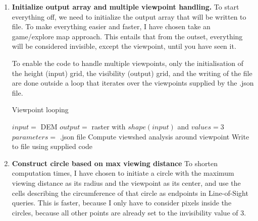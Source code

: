 \documentclass[a4paper]{article}
\begin{document}
\begin{enumerate}
    \item {\bfseries{Initialize output array and multiple viewpoint handling.}}\newline
    To start everything off, we need to initialize the output array that will be written to file. To make everything easier and faster, I have chosen take an game/explore map approach. This entails that from the outset, everything will be considered invisible, except the viewpoint, until you have seen it. 
    
    To enable the code to handle multiple viewpoints, only the initialisation of the height (input) grid, the visibility (output) grid, and the writing of the file are done outside a loop that iterates over the viewpoints supplied by the .json file.\newline
    
\begin{algorithm}
	\caption{Viewpoint looping} 
	\begin{algorithmic}[1]
	\State $input = $ DEM
	\State $output = $ raster with $shape(input)$ and $values = 3$ 
	\State $parameters = $ .json file
		    \State Compute viewshed analysis around viewpoint
		\EndFor
		\State Write to file using supplied code
	\end{algorithmic} 
\end{algorithm}
    \item{\bfseries{Construct circle based on max viewing distance}}\newline
    To shorten computation times, I have chosen to initiate a circle with the maximum viewing distance as its radius and the viewpoint as its center, and use the cells describing the circumference of that circle as endpoints in Line-of-Sight queries. This is faster, because I only have to consider pixels inside the circles, because all other points are already set to the invisibility value of 3.
    

\end{enumerate}
\end{document}
